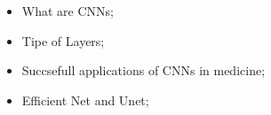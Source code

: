 \documentclass[../main.tex]{subfiles}
\begin{document}
\begin{itemize}

    \item What are CNNs;
    \item Tipe of Layers;
    \item Succsefull applications of CNNs in medicine;
    \item Efficient Net and Unet;
   
\end{itemize}
\end{document}
